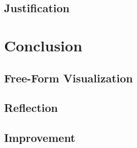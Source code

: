 \documentclass[a4paper]{article}
\begin{document}
\subsection{Justification}

\section{Conclusion}

\subsection{Free-Form Visualization}

\subsection{Reflection}

\subsection{Improvement}
\end{document}
